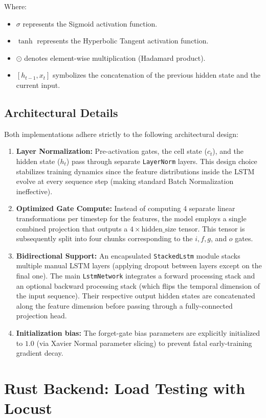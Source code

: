 \documentclass[12pt]{article}
\begin{document}
Where:
\begin{itemize}
    \item $\sigma$ represents the Sigmoid activation function.
    \item $\tanh$ represents the Hyperbolic Tangent activation function.
    \item $\odot$ denotes element-wise multiplication (Hadamard product).
    \item $[h_{t-1}, x_t]$ symbolizes the concatenation of the previous hidden state and the current input.
\end{itemize}

\subsection{Architectural Details}
Both implementations adhere strictly to the following architectural design:
\begin{enumerate}
    \item \textbf{Layer Normalization:} Pre-activation gates, the cell state ($c_t$), and the hidden state ($h_t$) pass through separate \texttt{LayerNorm} layers. This design choice stabilizes training dynamics since the feature distributions inside the LSTM evolve at every sequence step (making standard Batch Normalization ineffective).
    \item \textbf{Optimized Gate Compute:} Instead of computing 4 separate linear transformations per timestep for the features, the model employs a single combined projection that outputs a $4 \times \text{hidden\_size}$ tensor. This tensor is subsequently split into four chunks corresponding to the $i, f, g$, and $o$ gates.
    \item \textbf{Bidirectional Support:} An encapsulated \texttt{StackedLstm} module stacks multiple manual LSTM layers (applying dropout between layers except on the final one). The main \texttt{LstmNetwork} integrates a forward processing stack and an optional backward processing stack (which flips the temporal dimension of the input sequence). Their respective output hidden states are concatenated along the feature dimension before passing through a fully-connected projection head.
    \item \textbf{Initialization bias:} The forget-gate bias parameters are explicitly initialized to $1.0$ (via Xavier Normal parameter slicing) to prevent fatal early-training gradient decay.
\end{enumerate}


\section{Rust Backend: Load Testing with Locust}
\end{document}
